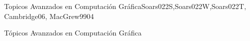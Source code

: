 \begin{syllabus}
\begin{unit}{Topicos Avanzados en Computación Gráfica}{}{Soars022S,Soars022W,Soars022T, Cambridge06, MacGrew99}{0}{4}
   \begin{learningoutcomes}
      \item Tópicos Avanzados en Computación Gráfica
   \end{learningoutcomes}
\end{unit}



\begin{coursebibliography}
\end{coursebibliography}

\end{syllabus}
